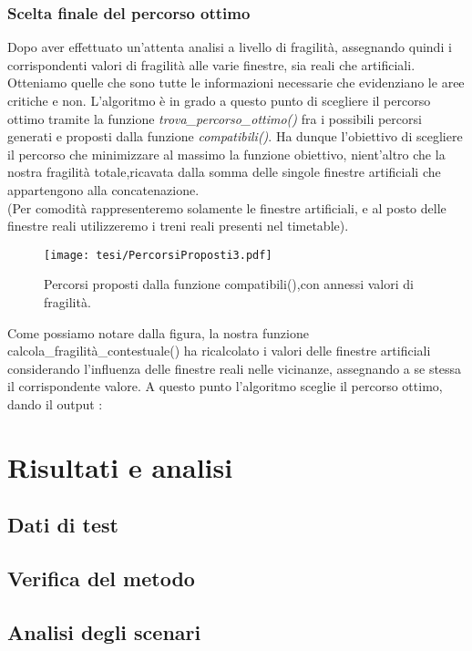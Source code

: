 \documentclass{report}
\begin{document}
\subsection{Scelta finale del percorso ottimo}
Dopo aver effettuato un'attenta analisi a livello di fragilità, assegnando quindi i corrispondenti valori di fragilità alle varie finestre, sia reali che artificiali. Otteniamo quelle che sono tutte le informazioni necessarie che evidenziano le aree critiche e non. L'algoritmo è in grado a questo punto di scegliere il percorso ottimo tramite la funzione \textit{trova\_percorso\_ottimo()} fra i possibili percorsi generati e proposti dalla funzione \textit{compatibili()}. Ha dunque l'obiettivo di scegliere il percorso che minimizzare al massimo la funzione obiettivo, nient'altro che la nostra fragilità totale,ricavata dalla somma delle singole finestre artificiali che appartengono alla concatenazione. \\
(Per comodità rappresenteremo solamente le finestre artificiali, e al posto delle finestre reali utilizzeremo i treni reali presenti nel timetable).
\begin{figure}[H]
    \centering
    \texttt{[image: tesi/PercorsiProposti3.pdf]}
    \caption{Percorsi proposti dalla funzione compatibili(),con annessi valori di fragilità.}
    \label{fig:placeholder}
\end{figure}

Come possiamo notare dalla figura, la nostra funzione calcola\_fragilità\_contestuale() ha ricalcolato i valori delle finestre artificiali considerando l'influenza delle finestre reali nelle vicinanze, assegnando a se stessa il corrispondente valore.
A questo punto l'algoritmo sceglie il percorso ottimo, dando il output : 

\chapter{Risultati e analisi}
\section{Dati di test}
\section{Verifica del metodo}
\section{Analisi degli scenari}
\end{document}
